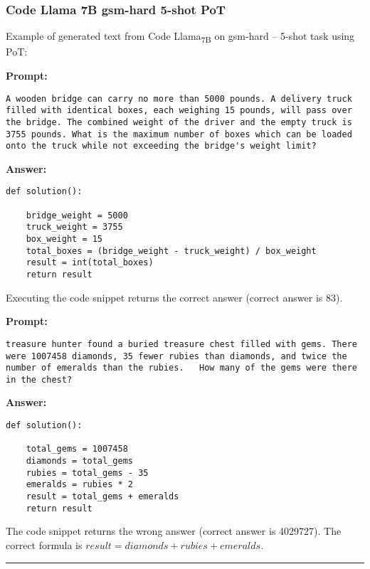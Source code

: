 	\subsubsection*{Code Llama 7B gsm-hard 5-shot PoT}
	\noindent Example of generated text from Code Llama\textsubscript{7B} on gsm-hard -- 5-shot task using PoT:
	\begin{displayquote}
		\textbf{Prompt:}
		\begin{Verbatim}[fontsize=\small,breaklines]
A wooden bridge can carry no more than 5000 pounds. A delivery truck filled with identical boxes, each weighing 15 pounds, will pass over the bridge. The combined weight of the driver and the empty truck is 3755 pounds. What is the maximum number of boxes which can be loaded onto the truck while not exceeding the bridge's weight limit?
	\end{Verbatim}
		\textbf{Answer:}
		\begin{Verbatim}[fontsize=\small,breaklines]
def solution():

    bridge_weight = 5000
    truck_weight = 3755
    box_weight = 15
    total_boxes = (bridge_weight - truck_weight) / box_weight
    result = int(total_boxes)
    return result
	\end{Verbatim}
	\end{displayquote}
	Executing the code snippet returns the correct answer (correct answer is 83).
	\begin{displayquote}
		\textbf{Prompt:}
		\begin{Verbatim}[fontsize=\small,breaklines]
 treasure hunter found a buried treasure chest filled with gems. There were 1007458 diamonds, 35 fewer rubies than diamonds, and twice the number of emeralds than the rubies.   How many of the gems were there in the chest?
	\end{Verbatim}
		\textbf{Answer:}
		\begin{Verbatim}[fontsize=\small,breaklines]
def solution():

    total_gems = 1007458
    diamonds = total_gems
    rubies = total_gems - 35
    emeralds = rubies * 2
    result = total_gems + emeralds
    return result
	\end{Verbatim}
	\end{displayquote}
	The code snippet returns the wrong answer (correct answer is 4029727).
	The correct formula is $result = diamonds + rubies + emeralds$.

	\noindent\rule{\textwidth}{0.4pt}

